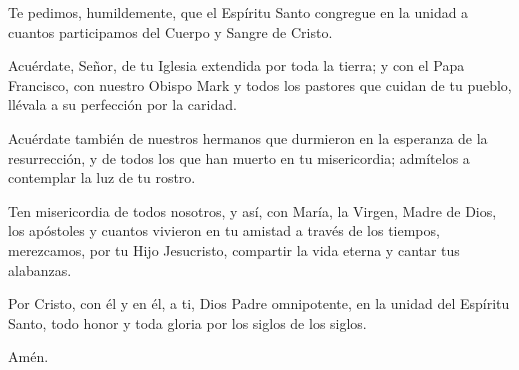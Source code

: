 \pr Te pedimos, humildemente, que el Espíritu Santo congregue en la unidad a cuantos participamos del Cuerpo y Sangre de Cristo.

\pr Acuérdate, Señor, de tu Iglesia extendida por toda la tierra; y con el Papa Francisco, con nuestro Obispo Mark y todos los pastores que cuidan de tu pueblo, llévala a su perfección por la caridad.

\pr Acuérdate también de nuestros hermanos que durmieron en la esperanza de la resurrección, y de todos los que han muerto en tu misericordia; admítelos a contemplar la luz de tu rostro.

\pr Ten misericordia de todos nosotros, y así, con María, la Virgen, Madre de Dios, los apóstoles y cuantos vivieron en tu amistad a través de los tiempos, merezcamos, por tu Hijo Jesucristo, compartir la vida eterna y cantar tus alabanzas.

\pr Por Cristo, con él y en él, a ti, Dios Padre omnipotente, en la unidad del Espíritu Santo, todo honor y toda gloria por los siglos de los siglos.

\be Amén.